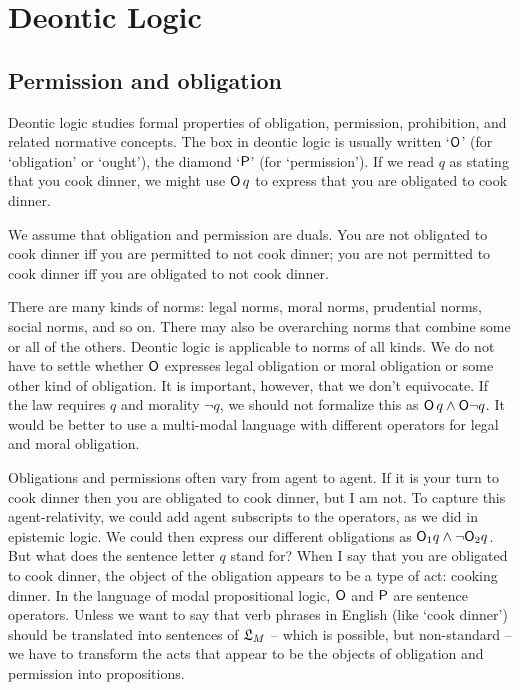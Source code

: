 \chapter{Deontic Logic}\label{ch:deontic}

\section{Permission and obligation}

Deontic logic studies formal properties of obligation, permission, prohibition,
and related normative concepts. The box in deontic logic is usually written
`$\operatorname{\mathsf{O}}$' (for `obligation' or `ought'), the diamond `$\operatorname{\mathsf{P}}$' (for `permission').
If we read $q$ as stating that you cook dinner, we might use $\operatorname{\mathsf{O}} q$ to express
that you are obligated to cook dinner.

We assume that obligation and permission are duals. You are not obligated to
cook dinner iff you are permitted to not cook dinner; you are not permitted to
cook dinner iff you are obligated to not cook dinner.

There are many kinds of norms: legal norms, moral norms, prudential norms,
social norms, and so on. There may also be overarching norms that combine some
or all of the others. Deontic logic is applicable to norms of all kinds. We do
not have to settle whether $\operatorname{\mathsf{O}}$ expresses legal obligation or moral obligation
or some other kind of obligation. It is important, however, that we don't
equivocate. If the law requires $q$ and morality $\neg q$, we should not
formalize this as $\operatorname{\mathsf{O}} q \land \operatorname{\mathsf{O}}\! \neg q$. It would be better to use a
multi-modal language with different operators for legal and moral obligation.


Obligations and permissions often vary from agent to agent. If it is your turn
to cook dinner then you are obligated to cook dinner, but I am not. To capture
this agent-relativity, we could add agent subscripts to the operators, as we did
in epistemic logic. We could then express our different obligations as
$\operatorname{\mathsf{O}}_1 \!q \land \neg \!\operatorname{\mathsf{O}}_2 \!q$. But what does the sentence letter $q$ stand for?
When I say that you are obligated to cook dinner, the object of the obligation
appears to be a type of act: cooking dinner. In the language of modal
propositional logic, $\operatorname{\mathsf{O}}$ and $\operatorname{\mathsf{P}}$ are sentence operators. Unless we want to
say that verb phrases in English (like `cook dinner') should be translated into
sentences of $\mathfrak{L}_M$ -- which is possible, but non-standard -- we have to
transform the acts that appear to be the objects of obligation and
permission into propositions.

